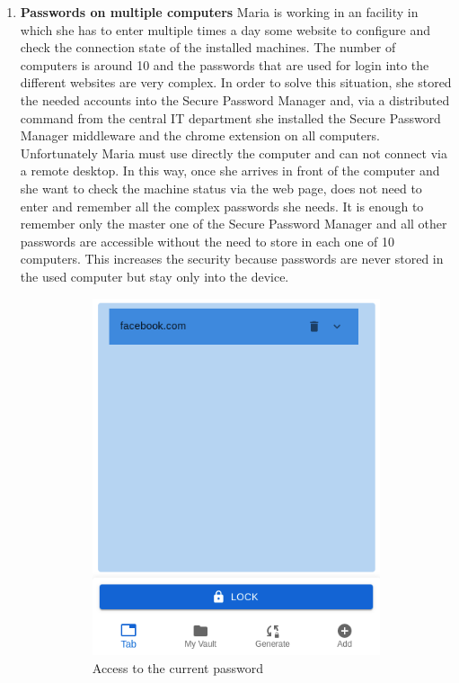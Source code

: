 \begin{enumerate}
	\item \textbf{Passwords on multiple computers} Maria is working in an facility in which she has to enter multiple times a day some website to configure and check the connection state of the installed machines. The number of computers is around 10 and the passwords that are used for login into the different websites are very complex. In order to solve this situation, she stored the needed accounts into the Secure Password Manager and, via a distributed command from the central IT department she installed the Secure Password Manager middleware and the chrome extension on all computers. Unfortunately Maria must use directly the computer and can not connect via a remote desktop. In this way, once she arrives in front of the computer and she want to check the machine status via the web page, does not need to enter and remember all the complex passwords she needs. It is enough to remember only the master one of the Secure Password Manager and all other passwords are accessible without the need to store in each one of 10 computers. This increases the security because passwords are never stored in the used computer but stay only into the device.
		\begin{figure}[H]
		\centering
		\begin{subfigure}{.5\textwidth}
			\centering
			\includegraphics[width=.6\linewidth]{images/extension/popup-lock-tab.png}
			\caption{Access to the current password}
			\label{fig:sub21}
		\end{subfigure}%
		\begin{subfigure}{.5\textwidth}
			\centering

\end{subfigure}
\end{figure}
\end{enumerate}
